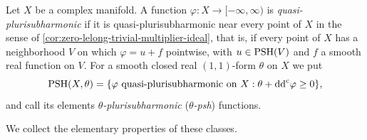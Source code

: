 \begin{definition}\label{def:quasi-psh-and-theta-psh}
Let $X$ be a complex manifold. A function $\varphi\colon X\to[-\infty,\infty)$ is \emph{quasi-plurisubharmonic} if it is quasi-plurisubharmonic near every point of $X$ in the sense of \cref{cor:zero-lelong-trivial-multiplier-ideal}, that is, if every point of $X$ has a neighborhood $V$ on which $\varphi=u+f$ pointwise, with $u\in\mathrm{PSH}(V)$ and $f$ a smooth real function on $V$. For a smooth closed real $(1,1)$-form $\theta$ on $X$ we put
\[
 \mathrm{PSH}(X,\theta)=\{\varphi\text{ quasi-plurisubharmonic on }X:\theta+\mathrm{dd}^{\mathrm{c}}\varphi\geq0\},
\]
and call its elements \emph{$\theta$-plurisubharmonic} (\emph{$\theta$-psh}) functions.
\end{definition}

We collect the elementary properties of these classes.

